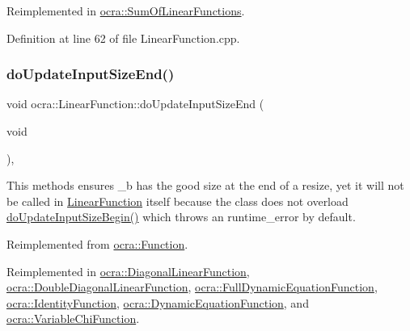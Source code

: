 Reimplemented in \hyperlink{classocra_1_1SumOfLinearFunctions_ab66be55a88e1c4e7d4e6f663f0a36683}{ocra\+::\+Sum\+Of\+Linear\+Functions}.



Definition at line 62 of file Linear\+Function.\+cpp.

\hypertarget{classocra_1_1LinearFunction_ac6bdf62ad6634397778d5f4223ed6d82}{}\label{classocra_1_1LinearFunction_ac6bdf62ad6634397778d5f4223ed6d82} 
\subsubsection{\texorpdfstring{do\+Update\+Input\+Size\+End()}{doUpdateInputSizeEnd()}}
{\footnotesize\ttfamily void ocra\+::\+Linear\+Function\+::do\+Update\+Input\+Size\+End (\begin{DoxyParamCaption}\item[{void}]{ }\end{DoxyParamCaption})\hspace{0.3cm}{\ttfamily [protected]}, {\ttfamily [virtual]}}

This methods ensures \+\_\+b has the good size at the end of a resize, yet it will not be called in \hyperlink{classocra_1_1LinearFunction}{Linear\+Function} itself because the class does not overload \hyperlink{classocra_1_1Function_a3f728f3758e6448aa59932853db5ddcc}{do\+Update\+Input\+Size\+Begin()} which throws an runtime\+\_\+error by default. 

Reimplemented from \hyperlink{classocra_1_1Function_a39f6d91b72eff2d32da7e4a85ee79f7d}{ocra\+::\+Function}.



Reimplemented in \hyperlink{classocra_1_1DiagonalLinearFunction_a8a51d23c302c9bad9579b95e29481f55}{ocra\+::\+Diagonal\+Linear\+Function}, \hyperlink{classocra_1_1DoubleDiagonalLinearFunction_a89070f8f2b068d8b6b3e216433e50538}{ocra\+::\+Double\+Diagonal\+Linear\+Function}, \hyperlink{group__constraint_ga8c14a0ff3f87c32d030a3a1753b7a77e}{ocra\+::\+Full\+Dynamic\+Equation\+Function}, \hyperlink{classocra_1_1IdentityFunction_adcfa8a32491113a590e7066f0062fbc6}{ocra\+::\+Identity\+Function}, \hyperlink{classocra_1_1DynamicEquationFunction_a8d20f6ed1e3983d1fddf648729eba955}{ocra\+::\+Dynamic\+Equation\+Function}, and \hyperlink{classocra_1_1VariableChiFunction_adbc1bb06d86e8ef65e8cdeb55db15353}{ocra\+::\+Variable\+Chi\+Function}.



